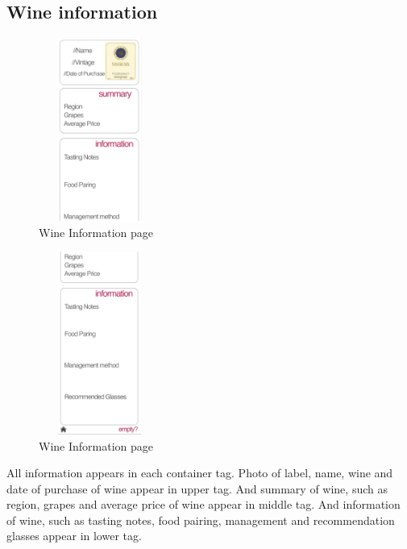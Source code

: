 \documentclass[sigconf, nonacm]{acmart}
\begin{document}
\subsection{Wine information}
\begin{figure}
  \centering
  \includegraphics[width=4cm, height=6cm]{wineinfo.png}
  \caption{Wine Information page}
  \label{fig:wine info}
\end{figure}
\begin{figure}
  \centering
  \includegraphics[width=4cm, height=6cm]{wineinfo2.png}
  \caption{Wine Information page}
  \label{fig:wine info}
\end{figure}
All information appears in each container tag. Photo
of label, name, wine and date of purchase of wine
appear in upper tag. And summary of wine, such as
region, grapes and average price of wine appear in
middle tag. And information of wine, such as tasting
notes, food pairing, management and recommendation
glasses appear in lower tag.
\end{document}
